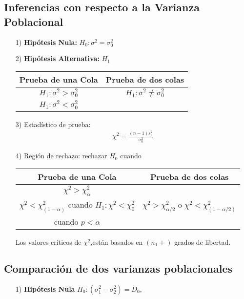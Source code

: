 \begin{itemize}
\subsection*{Inferencias con respecto a la Varianza Poblacional}
\begin{itemize}
\item[1) ] \textbf{Hip\'otesis Nula:} $H_{0}:\sigma^{2}=\sigma^{2}_{0}$
\item[2) ] \textbf{Hip\'otesis Alternativa: } $H_{1}$
\begin{tabular}{cc}\hline
\textbf{Prueba de una Cola} & \textbf{Prueba de dos colas}\\\hline
$H_{1}:\sigma^{2}>\sigma^{2}_{0}$ & $H_{1}:\sigma^{2}\neq \sigma^{2}_{0}$\\ 
$H_{1}:\sigma^{2}<\sigma^{2}_{0}$&\\
\end{tabular}
\item[3) ] Estad\'istico de prueba:
\begin{eqnarray*}
\chi^{2}=\frac{\left(n-1\right)s^{2}}{\sigma^{2}_{0}}
\end{eqnarray*}
\item[4) ] Regi\'on de rechazo: rechazar $H_{0}$ cuando
\begin{tabular}{cc}\hline
\textbf{Prueba de una Cola} & \textbf{Prueba de dos colas}\\\hline
$\chi^{2}>\chi^{2}_{\alpha}$ & \\
$\chi^{2}<\chi^{2}_{\left(1-\alpha\right)}$ cuando $H_{1}:\chi^{2}<\chi^{2}_{0}$&$\chi^{2}>\chi^{2}_{\alpha/2}$ o $\chi^{2}<\chi^{2}_{\left(1-\alpha/2\right)}$\\
 cuando $p<\alpha$&\\
\end{tabular}

Los valores cr\'iticos de $\chi^{2}$,est\'an basados en $\left(n_{1}+\right)$ grados de libertad.

\end{itemize}
\subsection*{Comparaci\'on de dos varianzas poblacionales}

\begin{itemize}
\item[1) ] \textbf{Hip\'otesis Nula} $H_{0}:\left(\sigma^{2}_{1}-\sigma^{2}_{2}\right)=D_{0}$,\medskip


\end{itemize}
\end{itemize}

